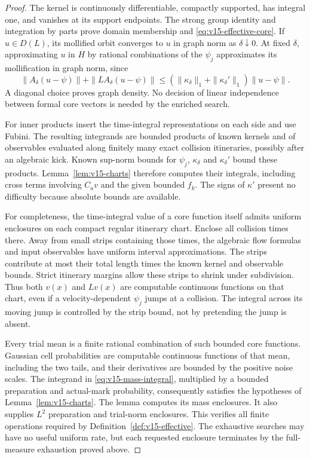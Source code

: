 \begin{proof}
The kernel is continuously differentiable, compactly supported, has
integral one, and vanishes at its support endpoints. The strong group
identity and integration by parts prove domain membership and
\eqref{eq:v15-effective-core}. If $u\in D(L)$, its mollified orbit
converges to $u$ in graph norm as $\delta\downarrow0$. At fixed
$\delta$, approximating $u$ in $H$ by rational combinations of the
$\psi_j$ approximates its mollification in graph norm, since
\[
 \|A_\delta(u-\psi)\|+\|LA_\delta(u-\psi)\|
 \le (\|\kappa_\delta\|_1+\|\kappa_\delta'\|_1)\|u-\psi\|.
\]
A diagonal choice proves graph density. No decision of linear
independence between formal core vectors is needed by the enriched
search.

For inner products insert the time-integral representations on each
side and use Fubini. The resulting integrands are bounded products of
known kernels and of observables evaluated along finitely many exact
collision itineraries, possibly after an algebraic kick. Known sup-norm
bounds for $\psi_j$, $\kappa_\delta$ and $\kappa_\delta'$ bound these
products. Lemma~\ref{lem:v15-charts} therefore computes their integrals,
including cross terms involving $C_av$ and the given bounded $f_k$.
The signs of $\kappa'$ present no difficulty because absolute bounds
are available.

For completeness, the time-integral value of a core function itself
admits uniform enclosures on each compact regular itinerary chart.
Enclose all collision times there. Away from small strips containing
those times, the algebraic flow formulas and input observables have
uniform interval approximations. The strips contribute at most their
total length times the known kernel and observable bounds. Strict
itinerary margins allow these strips to shrink under subdivision.
Thus both $v(x)$ and $Lv(x)$ are computable continuous functions on
that chart, even if a velocity-dependent $\psi_j$ jumps at a collision.
The integral across its moving jump is controlled by the strip bound,
not by pretending the jump is absent.

Every trial mean is a finite rational combination of such bounded
core functions. Gaussian cell probabilities are computable continuous
functions of that mean, including the two tails, and their derivatives
are bounded by the positive noise scales. The integrand in
\eqref{eq:v15-mass-integral}, multiplied by a bounded preparation and
actual-mark probability, consequently satisfies the hypotheses of
Lemma~\ref{lem:v15-charts}. The lemma computes its mass enclosures.
It also supplies $L^2$ preparation and trial-norm enclosures. This
verifies all finite operations required by Definition~\ref{def:v15-effective}.
The exhaustive searches may have no useful uniform rate, but each
requested enclosure terminates by the full-measure exhaustion proved
above.
\end{proof}

